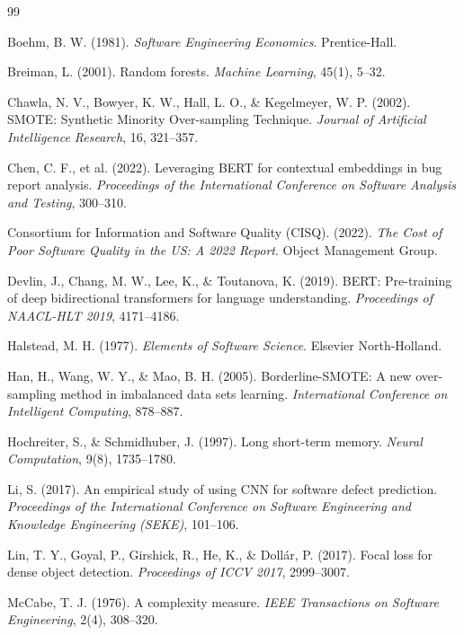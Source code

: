 \documentclass[12pt,a4paper,oneside]{report}
\begin{document}

\begin{thebibliography}{99}

Boehm, B. W. (1981). \textit{Software Engineering Economics}. Prentice-Hall.

Breiman, L. (2001). Random forests. \textit{Machine Learning}, 45(1), 5--32.

Chawla, N. V., Bowyer, K. W., Hall, L. O., \& Kegelmeyer, W. P. (2002). SMOTE: Synthetic Minority Over-sampling Technique. \textit{Journal of Artificial Intelligence Research}, 16, 321--357.

Chen, C. F., et al. (2022). Leveraging BERT for contextual embeddings in bug report analysis. \textit{Proceedings of the International Conference on Software Analysis and Testing}, 300--310.

Consortium for Information and Software Quality (CISQ). (2022). \textit{The Cost of Poor Software Quality in the US: A 2022 Report}. Object Management Group.

Devlin, J., Chang, M. W., Lee, K., \& Toutanova, K. (2019). BERT: Pre-training of deep bidirectional transformers for language understanding. \textit{Proceedings of NAACL-HLT 2019}, 4171--4186.

Halstead, M. H. (1977). \textit{Elements of Software Science}. Elsevier North-Holland.

Han, H., Wang, W. Y., \& Mao, B. H. (2005). Borderline-SMOTE: A new over-sampling method in imbalanced data sets learning. \textit{International Conference on Intelligent Computing}, 878--887.

Hochreiter, S., \& Schmidhuber, J. (1997). Long short-term memory. \textit{Neural Computation}, 9(8), 1735--1780.

Li, S. (2017). An empirical study of using CNN for software defect prediction. \textit{Proceedings of the International Conference on Software Engineering and Knowledge Engineering (SEKE)}, 101--106.

Lin, T. Y., Goyal, P., Girshick, R., He, K., \& Dollár, P. (2017). Focal loss for dense object detection. \textit{Proceedings of ICCV 2017}, 2999--3007.

McCabe, T. J. (1976). A complexity measure. \textit{IEEE Transactions on Software Engineering}, 2(4), 308--320.


\end{thebibliography}
\end{document}
